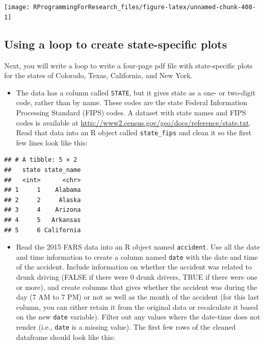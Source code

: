 \documentclass[]{book}
\providecommand{\tightlist}{%
  \setlength{\itemsep}{0pt}\setlength{\parskip}{0pt}}
\begin{document}
\begin{center}\texttt{[image: RProgrammingForResearch\_files/figure-latex/unnamed-chunk-408-1]} \end{center}

\subsection{Using a loop to create state-specific
plots}\label{using-a-loop-to-create-state-specific-plots}

Next, you will write a loop to write a four-page pdf file with
state-specific plots for the states of Colorado, Texas, California, and
New York.

\begin{itemize}
\tightlist
\item
  The data has a column called \texttt{STATE}, but it gives state as a
  one- or two-digit code, rather than by name. These codes are the state
  Federal Information Processing Standard (FIPS) codes. A dataset with
  state names and FIPS codes is available at
  \url{http://www2.census.gov/geo/docs/reference/state.txt}. Read that
  data into an R object called \texttt{state\_fips} and clean it so the
  first few lines look like this:
\end{itemize}

\begin{verbatim}
## # A tibble: 5 × 2
##   state state_name
##   <int>      <chr>
## 1     1    Alabama
## 2     2     Alaska
## 3     4    Arizona
## 4     5   Arkansas
## 5     6 California
\end{verbatim}

\begin{itemize}
\tightlist
\item
  Read the 2015 FARS data into an R object named \texttt{accident}. Use
  all the date and time information to create a column named
  \texttt{date} with the date and time of the accident. Include
  information on whether the accident was related to drunk driving
  (FALSE if there were 0 drunk drivers, TRUE if there were one or more),
  and create columns that gives whether the accident was during the day
  (7 AM to 7 PM) or not as well as the month of the accident (for this
  last column, you can either retain it from the original data or
  recalculate it based on the new \texttt{date} variable). Filter out
  any values where the date-time does not render (i.e., \texttt{date} is
  a missing value). The first few rows of the cleaned dataframe should
  look like this:
\end{itemize}
\end{document}
